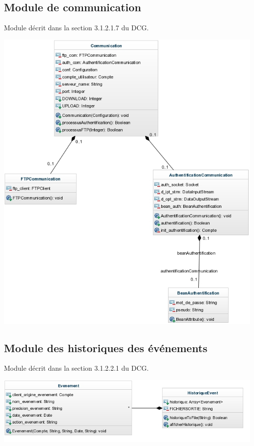 \documentclass[10pt,a4paper]{report}
\begin{document}
\subsection{Module de communication}
Module décrit dans la section 3.1.2.1.7 du DCG.
\begin{center}
	\includegraphics{./Ressources/communication.jpeg}\\
\end{center}

\newpage

\subsection{Module des historiques des événements}
Module décrit dans la section 3.1.2.2.1 du DCG.
\begin{center}
	\includegraphics{./Ressources/historiqueEvenement.jpeg}\\
\end{center}
\end{document}

